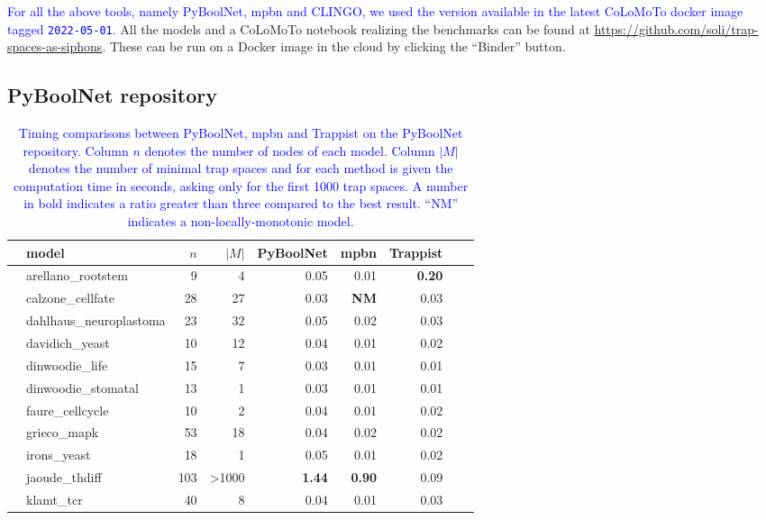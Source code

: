 \documentclass[runningheads]{llncs}
\newcounter{rownumber}
\newcommand\rownb{\stepcounter{rownumber}\arabic{rownumber}}
\newcommand{\revise}[1]{\textcolor{blue}{#1}}
\begin{document}
\revise{For all the above tools, namely PyBoolNet, mpbn and CLINGO, we used the version available in the latest CoLoMoTo docker image tagged \texttt{2022-05-01}.}
All the models and a CoLoMoTo notebook realizing the benchmarks can be found at \url{https://github.com/soli/trap-spaces-as-siphons}. These can be run on a Docker image in the cloud by clicking the ``Binder'' button.

\subsection{PyBoolNet repository}

\setlength{\tabcolsep}{4pt}
\begin{table}[!htb]
  \caption{\revise{Timing comparisons between PyBoolNet, mpbn and Trappist on the PyBoolNet repository.
    Column \(n\) denotes the number of nodes of each model. Column \(|M|\) denotes the number of minimal trap spaces and for each method is given the computation time in seconds, asking only for the first 1000 trap spaces.
    A number in bold indicates a ratio greater than three compared to the best result. ``NM'' indicates a non-locally-monotonic model.}}
  \centering%
  \label{tab:pyboolnet_repo}
  \begin{tabular}{rlrrrrrrr}
    \toprule
    & model & $n$ & $|M|$ & PyBoolNet & mpbn & Trappist \\ \midrule
    \rownb & arellano\_rootstem & 9 & 4 & 0.05 & 0.01 & \textbf{0.20}\\
    \rownb & calzone\_cellfate & 28 & 27 & 0.03 & \textbf{NM} & 0.03\\
    \rownb & dahlhaus\_neuroplastoma & 23 & 32 & 0.05 & 0.02 & 0.03\\
    \rownb & davidich\_yeast & 10 & 12 & 0.04 & 0.01 & 0.02\\
    \rownb & dinwoodie\_life & 15 & 7 & 0.03 & 0.01 & 0.01\\
    \rownb & dinwoodie\_stomatal & 13 & 1 & 0.03 & 0.01 & 0.01\\
    \rownb & faure\_cellcycle & 10 & 2 & 0.04 & 0.01 & 0.02\\
    \rownb & grieco\_mapk & 53 & 18 & 0.04 & 0.02 & 0.02\\
    \rownb & irons\_yeast & 18 & 1 & 0.05 & 0.01 & 0.02\\
    \rownb & jaoude\_thdiff & 103 & >1000 & \textbf{1.44} & \textbf{0.90} & 0.09\\
    \rownb & klamt\_tcr & 40 & 8 & 0.04 & 0.01 & 0.03\\

\end{tabular}
\end{table}
\end{document}
